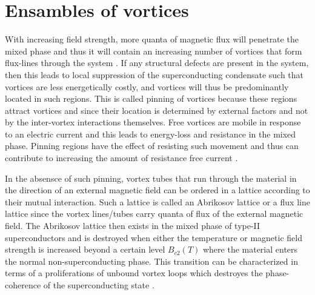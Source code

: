 \section{Ensambles of vortices}

With increasing field strength, more quanta of magnetic flux will penetrate the mixed phase and thus it will contain an increasing number of vortices that form flux-lines through the system
. If any structural defects are present in the
system, then this leads to local suppression of the superconducting condensate such that vortices are less energetically costly, and vortices will thus be predominantly located in such regions.
This is called pinning of vortices because these regions attract vortices and since their location is determined by external factors and not by the inter-vortex interactions themselves.
Free vortices are mobile in 
response to an electric current and this leads to energy-loss and resistance in the mixed phase. Pinning regions have the effect of resisting such movement and thus can contribute to increasing
the amount of resistance free current \cite{Ishida19}.

In the absensce of such pinning, vortex tubes that run through the material in the direction of an external magnetic field can be ordered in a lattice according to their mutual interaction.
Such a lattice is called an Abrikosov lattice or a flux line lattice since the vortex lines/tubes carry quanta of flux of the external magnetic field.
The Abrikosov lattice then exists in the mixed phase of type-II superconductors and is destroyed when either the temperature or magnetic field strength is increased beyond a certain level
$B_{c2}(T)$ where the material enters the normal non-superconducting phase. This transition can be characterized in terms of a proliferations of unbound vortex loops which destroyes the
phase-coherence of the superconducting state \cite{Fossheim-Sudbo-Book}.

